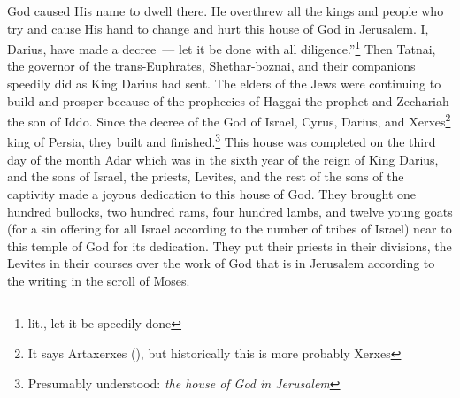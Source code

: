 \begin{enumerate*}[mode=unboxed]
     God caused His name to dwell there. He overthrew all the kings and people who try and cause His hand to change and hurt this house of God in Jerusalem. I, Darius, have made a decree~--- let it be done with all diligence.''\footnote{lit., let it be speedily done}%
     Then Tatnai, the governor of the trans-Euphrates, Shethar-boznai, and their companions speedily did as King Darius had sent.%
     The elders of the Jews were continuing to build and prosper because of the prophecies of Haggai the prophet and Zechariah the son of Iddo. Since the decree of the God of Israel, Cyrus, Darius, and Xerxes\footnote{It says Artaxerxes (), but historically this is more probably Xerxes} king of Persia, they built and finished.\footnote{Presumably understood: \textit{the house of God in Jerusalem}}%
     This house was completed on the third day of the month Adar which was in the sixth year of the reign of King Darius,%
     and the sons of Israel, the priests, Levites, and the rest of the sons of the captivity made a joyous dedication to this house of God.%
     They brought one hundred bullocks, two hundred rams, four hundred lambs, and twelve young goats (for a sin offering for all Israel according to the number of tribes of Israel) near to this temple of God for its dedication.%
     They put their priests in their divisions, the Levites in their courses over the work of God that is in Jerusalem according to the writing in the scroll of Moses.%
\end{enumerate*}
